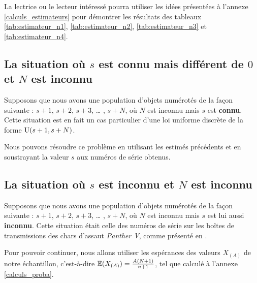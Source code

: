 \documentclass[10pt]{article}
\begin{document}
La lectrice ou le lecteur intéressé pourra utiliser les idées présentées
à l'annexe \ref{calculs_estimateurs} pour démontrer les résultats des
tableaux \ref{tab:estimateur_n1}, \ref{tab:estimateur_n2},
\ref{tab:estimateur_n3} et \ref{tab:estimateur_n4}.

\hypertarget{la-situation-ou-s-est-connu-mais-different-de-0-et-n-est-inconnu}{%
\subsection{\texorpdfstring{La situation où \(s\) est \textbf{connu}
mais différent de \(0\) et \(N\) est
\textbf{inconnu}}{La situation où s est connu mais différent de 0 et N est inconnu}}\label{la-situation-ou-s-est-connu-mais-different-de-0-et-n-est-inconnu}}

Supposons que nous avons une population d'objets numérotés de la façon
suivante : \(s+1\), \(s+2\), \(s+3\), \ldots{} , \(s+N\), où \(N\) est
inconnu mais \(s\) est \textbf{connu}. Cette situation est en fait un
cas particulier d'une loi uniforme discrète de la forme
\(\operatorname{U}(s+1,s+N)\).

Nous pouvons résoudre ce problème en utilisant les estimés précédents et
en soustrayant la valeur \(s\) aux numéros de série obtenus.

\hypertarget{la-situation-ou-s-est-inconnu-et-n-est-inconnu}{%
\subsection{\texorpdfstring{La situation où \(s\) est \textbf{inconnu}
et \(N\) est
\textbf{inconnu}}{La situation où s est inconnu et N est inconnu}}\label{la-situation-ou-s-est-inconnu-et-n-est-inconnu}}

Supposons que nous avons une population d'objets numérotés de la façon
suivante : \(s+1\), \(s+2\), \(s+3\), \ldots{} , \(s+N\), où \(N\) est
inconnu mais \(s\) est lui aussi \textbf{inconnu}. Cette situation était
celle des numéros de série sur les boîtes de transmissions des chars
d'assaut \emph{Panther V}, comme présenté en \cite{Ruggles1947}.

Pour pouvoir continuer, nous allons utiliser les espérances des valeurs
\(X_{(A)}\) de notre échantillon, c'est-à-dire
\(\operatorname{\mathbb{E}} (X_{(A)})=\frac{A(N+1)}{n+1}\), tel que calculé à l'annexe
\ref{calculs_proba}.
\end{document}
